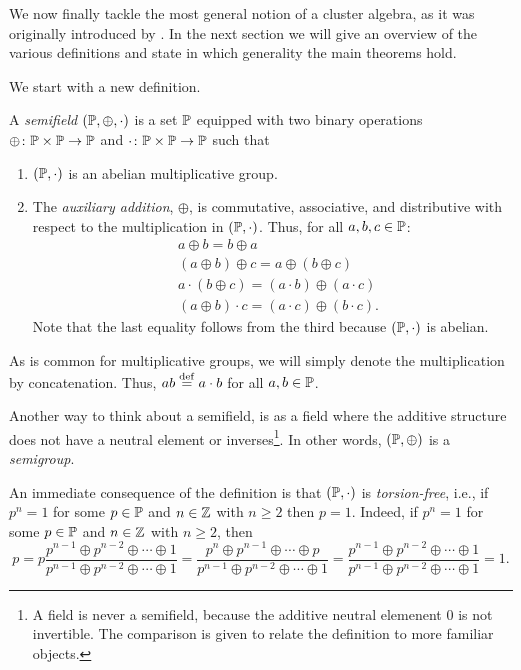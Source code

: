 We now finally tackle the most general notion of a cluster algebra, as it was
originally introduced by \textcite{FominZelevinsky2002CAF}. In the next section we will
give an overview of the various definitions and state in which generality the main
theorems hold.

\medskip

We start with a new definition.
\begin{definition}

	A \emph{semifield} $(\mathbb{P}, \oplus, \cdot)$ is a set
	$\mathbb{P}$ equipped with two binary operations $\oplus \colon \mathbb{P} \times
		\mathbb{P} \to \mathbb{P}$ and $\cdot \colon \mathbb{P} \times \mathbb{P} \to \mathbb{P}$ such that
	\begin{enumerate}
		\item $(\mathbb{P}, \cdot)$ is an abelian multiplicative group.
		\item The \emph{auxiliary addition}, $\oplus$, is commutative,
		      associative, and distributive with respect to the multiplication in $(\mathbb{P}, \cdot)$.
		      Thus, for all $a,b,c \in \mathbb{P}$:
		      \begin{align*}
			       & a \oplus b = b \oplus a                                \\
			       & (a \oplus b) \oplus c =  a \oplus (b \oplus c)         \\
			       & a \cdot (b \oplus c) = (a \cdot b) \oplus (a \cdot c)  \\
			       & (a \oplus b) \cdot c = (a \cdot c) \oplus (b \cdot c).
		      \end{align*}
		      Note that the last equality follows from the third because $(\mathbb{P}, \cdot)$ is abelian.
	\end{enumerate}
	As is common for multiplicative groups, we will simply denote the multiplication by
	concatenation. Thus, $ab \overset{\mathrm{def}}{=} a \cdot b$ for all $a, b \in \mathbb{P}$.
\end{definition}

Another way to think about a semifield, is as a field where the additive structure does
not have a neutral element or inverses\footnote{A field is never a semifield, because
	the additive neutral elemenent $0$ is not invertible. The comparison is given to relate
	the definition to more familiar objects.}. In other words, $(\mathbb{P}, \oplus)$ is a
\emph{semigroup}.

An immediate consequence of the definition is that $(\mathbb{P}, \cdot)$ is
\emph{torsion-free}, i.e., if $p^n = 1$ for some $p\in \mathbb{P}$
and $n \in \mathbb{Z}$ with $n\geq 2$ then $p = 1$. Indeed, if $p^n = 1$ for some $p \in
	\mathbb{P}$ and $n \in \mathbb{Z}$ with $n \geq 2$, then
\begin{equation*}
	p
	= p \frac{p^{n-1} \oplus p^{n-2} \oplus \cdots \oplus 1}{ p^{n-1} \oplus p^{n-2} \oplus \cdots \oplus 1}
	= \frac{p^n \oplus p^{n-1} \oplus \cdots \oplus p}{ p^{n-1} \oplus p^{n-2} \oplus \cdots \oplus 1}
	= \frac{p^{n-1} \oplus p^{n-2} \oplus \cdots \oplus 1}{ p^{n-1} \oplus p^{n-2} \oplus \cdots \oplus 1}
	=1.
\end{equation*}


